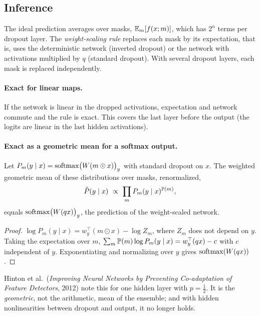 \begin{notechapter}
\section{Inference}\label{dropout:sec:inference}

The ideal prediction averages over masks, $\mathbb{E}_m[f(x; m)]$, which has $2^n$ terms per dropout layer.
The \emph{weight-scaling rule} replaces each mask by its expectation, that is, uses the
deterministic network (inverted dropout) or the network with activations multiplied by $q$
(standard dropout). With several dropout layers, each mask is replaced independently.

\paragraph{Exact for linear maps.} If the network is linear in the dropped activations,
expectation and network commute and the rule is exact. This covers the last layer before
the output (the logits are linear in the last hidden activations).

\paragraph{Exact as a geometric mean for a softmax output.}

\begin{proposition}\label{dropout:prop:geometric}
Let $P_m(y\mid x) = \operatorname{softmax}\bigl(W(m\odot x)\bigr)_y$ with standard dropout on $x$. The weighted geometric mean of
these distributions over masks, renormalized,
\[
  \tilde P(y\mid x)\ \propto\ \prod_mP_m(y\mid x)^{\Prob(m)},
\]
equals $\operatorname{softmax}\bigl(W(qx)\bigr)_y$, the prediction of the weight-scaled network.
\end{proposition}

\begin{proof}
$\log P_m(y\mid x) = w_y^\top(m\odot x) - \log Z_m$, where $Z_m$ does not depend on $y$. Taking the expectation over $m$,
$\sum_m\mathbb{P}(m)\log P_m(y\mid x) = w_y^\top(qx) - c$ with $c$ independent of $y$. Exponentiating and normalizing
over $y$ gives $\operatorname{softmax}(W(qx))$.
\end{proof}

Hinton et al.\ (\emph{Improving Neural Networks by Preventing Co-adaptation of Feature
Detectors}, 2012) note this for one hidden layer with $p = \frac12$. It is the \emph{geometric}, not the
arithmetic, mean of the ensemble; and with hidden nonlinearities between dropout and
output, it no longer holds.


\end{notechapter}
